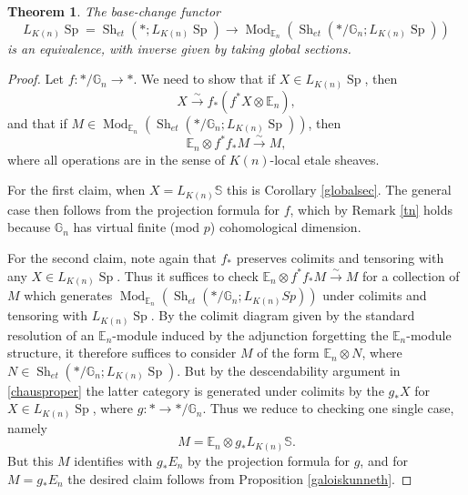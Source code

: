 \documentclass[12pt]{article}
\newtheorem{theorem}{Theorem}[section]
\newcommand{\on}{\operatorname}
\begin{document}
\begin{theorem}\label{kndescent}
The base-change functor
$$L_{K(n)}\on{Sp}=\on{Sh}_{et}(\ast;L_{K(n)}\on{Sp}) \to \on{Mod}_{\mathbb{E}_n}(\on{Sh}_{et}(\ast/\mathbb{G}_n;L_{K(n)}\on{Sp}))$$
is an equivalence, with inverse given by taking global sections.
\end{theorem}
\begin{proof}
Let $f:\ast/\mathbb{G}_n\to\ast$.  We need to show that if $X\in L_{K(n)}\on{Sp}$, then
$$X\overset{\sim}{\rightarrow} f_\ast(f^\ast X \otimes \mathbb{E}_n),$$
and that if $M\in\on{Mod}_{\mathbb{E}_n}(\on{Sh}_{et}(\ast/\mathbb{G}_n;L_{K(n)}\on{Sp}))$, then
$$\mathbb{E}_n\otimes f^\ast f_\ast M \overset{\sim}{\rightarrow} M,$$
where all operations are in the sense of $K(n)$-local etale sheaves.

For the first claim, when $X=L_{K(n)}\mathbb{S}$ this is Corollary \ref{globalsec}.  The general case then follows from the projection formula for $f$, which by Remark \ref{tn} holds because $\mathbb{G}_n$ has virtual finite (mod $p$) cohomological dimension.

For the second claim, note again that $f_\ast$ preserves colimits and tensoring with any $X\in L_{K(n)}\on{Sp}$.  Thus it suffices to check $\mathbb{E}_n\otimes f^\ast f_\ast M\overset{\sim}{\to} M$ for a collection of $M$ which generates $\on{Mod}_{\mathbb{E}_n}(\on{Sh}_{et}(\ast/\mathbb{G}_n;L_{K(n)}Sp))$ under colimits and tensoring with $L_{K(n)}\on{Sp}$.  By the colimit diagram given by the standard resolution of an $\mathbb{E}_n$-module induced by the adjunction forgetting the $\mathbb{E}_n$-module structure, it therefore suffices to consider $M$ of the form $\mathbb{E}_n \otimes N$, where $N\in\on{Sh}_{et}(\ast/\mathbb{G}_n;L_{K(n)}\on{Sp})$.  But by the descendability argument in \ref{chausproper} the latter category is generated under colimits by the $g_\ast X$ for $X\in L_{K(n)}\on{Sp}$, where $g:\ast \to \ast/\mathbb{G}_n$.  Thus we reduce to checking one single case, namely
$$M = \mathbb{E}_n\otimes g_\ast L_{K(n)}\mathbb{S}.$$
But this $M$ identifies with $g_\ast E_n$ by the projection formula for $g$, and for $M=g_\ast E_n$ the desired claim follows from Proposition \ref{galoiskunneth}.
\end{proof}
\end{document}
